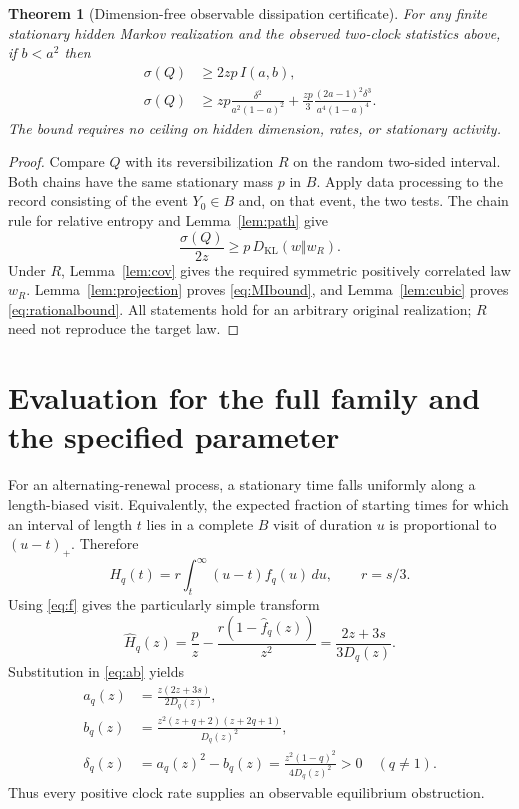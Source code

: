 \documentclass[11pt,a4paper]{article}
\newtheorem{theorem}{Theorem}
\newcommand{\KL}{D_{\mathrm{KL}}}
\newcommand{\sig}{\sigma}
\begin{document}
\begin{theorem}[Dimension-free observable dissipation certificate]\label{thm:certificate}
For any finite stationary hidden Markov realization and the observed two-clock statistics above, if $b<a^2$ then
\begin{align}
 \sig(Q)&\geq2zp\,I(a,b),\label{eq:MIbound}\\
 \sig(Q)&\geq zp\frac{\delta^2}{a^2(1-a)^2}
 +\frac{zp}{3}\frac{(2a-1)^2\delta^3}{a^4(1-a)^4}.
 \label{eq:rationalbound}
\end{align}
The bound requires no ceiling on hidden dimension, rates, or stationary activity.
\end{theorem}
\begin{proof}
Compare $Q$ with its reversibilization $R$ on the random two-sided interval. Both chains have the same stationary mass $p$ in $B$. Apply data processing to the record consisting of the event $Y_0\in B$ and, on that event, the two tests. The chain rule for relative entropy and Lemma~\ref{lem:path} give
\[
 \frac{\sig(Q)}{2z}\geq p\,\KL(w\Vert w_R).
\]
Under $R$, Lemma~\ref{lem:cov} gives the required symmetric positively correlated law $w_R$. Lemma~\ref{lem:projection} proves \eqref{eq:MIbound}, and Lemma~\ref{lem:cubic} proves \eqref{eq:rationalbound}. All statements hold for an arbitrary original realization; $R$ need not reproduce the target law.
\end{proof}

\section{Evaluation for the full family and the specified parameter}
For an alternating-renewal process, a stationary time falls uniformly along a length-biased visit. Equivalently, the expected fraction of starting times for which an interval of length $t$ lies in a complete $B$ visit of duration $u$ is proportional to $(u-t)_+$. Therefore
\[
 H_q(t)=r\int_t^\infty(u-t)f_q(u)\,du,
 \qquad r=s/3.
\]
Using \eqref{eq:f} gives the particularly simple transform
\begin{equation}\label{eq:Hq}
 \widehat H_q(z)=\frac{p}{z}-\frac{r(1-\widehat f_q(z))}{z^2}
 =\frac{2z+3s}{3D_q(z)}.
\end{equation}
Substitution in \eqref{eq:ab} yields
\begin{align}
 a_q(z)&=\frac{z(2z+3s)}{2D_q(z)},\label{eq:aq}\\
 b_q(z)&=\frac{z^2(z+q+2)(z+2q+1)}{D_q(z)^2},\label{eq:bq}\\
 \delta_q(z)&=a_q(z)^2-b_q(z)
 =\frac{z^2(1-q)^2}{4D_q(z)^2}>0\quad(q\ne1).
 \label{eq:deltaq}
\end{align}
Thus every positive clock rate supplies an observable equilibrium obstruction.
\end{document}
